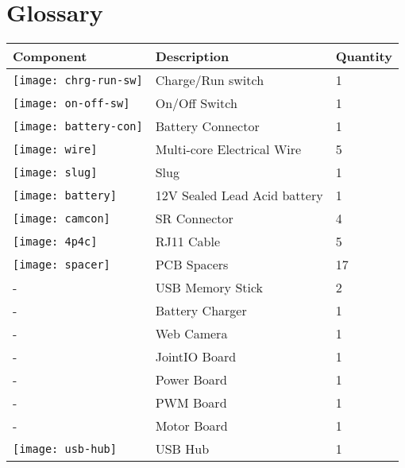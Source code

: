 
\section{Glossary}
\label{sec:glossary}
\begin{longtable}{| l | l| l |}
\hline
\textbf{Component} & \textbf{Description} & \textbf{Quantity} \\ \hline
\texttt{[image: chrg-run-sw]}  & Charge/Run switch & 1 \\ \hline
\texttt{[image: on-off-sw]}  & On/Off Switch & 1 \\ \hline
\texttt{[image: battery-con]}  & Battery Connector & 1 \\ \hline
\texttt{[image: wire]}  & Multi-core Electrical Wire & 5 \\ \hline
\texttt{[image: slug]}  & Slug & 1 \\ \hline
\texttt{[image: battery]}  & 12V Sealed Lead Acid battery & 1 \\ \hline
\texttt{[image: camcon]}  & SR Connector & 4 \\ \hline
\texttt{[image: 4p4c]}  & RJ11 Cable & 5 \\ \hline
\texttt{[image: spacer]}  & PCB Spacers & 17 \\ \hline
-  & USB Memory Stick & 2 \\ \hline
-  & Battery Charger & 1 \\ \hline
- & Web Camera & 1 \\ \hline
- & JointIO Board & 1 \\ \hline
- & Power Board & 1 \\ \hline
- & PWM Board & 1 \\ \hline
- & Motor Board & 1 \\ \hline
\texttt{[image: usb-hub]} & USB Hub & 1 \\ \hline
\end{longtable}
